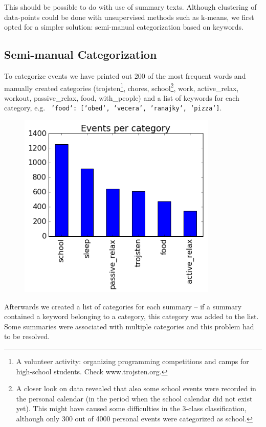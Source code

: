\documentclass[a4paper, 12pt]{article}
\begin{document}
This should be possible to do with use of summary texts. Although clustering
of data-points could be done with unsupervised methods such as k-means,
we first opted for a simpler solution: semi-manual categorization based on keywords. 

\subsection{Semi-manual Categorization}
To categorize events we have printed out 200 of the most frequent words
and manually created categories (trojsten\footnote{A volunteer activity: organizing
programming competitions and camps for high-school students. Check www.trojsten.org.}, 
chores, school\footnote{A closer look on data revealed that also some school events 
were recorded in the personal calendar (in the period when the school calendar did not exist yet).
This might have caused some difficulties in the 3-class classification, although
only 300 out of 4000 personal events were categorized as school.}, work, 
active\_relax, workout, passive\_relax, food, with\_people) 
and a list of keywords for each category, e.g. \texttt{
{'}food{'}: [{'}obed{'}, {'}vecera{'}, {'}ranajky{'}, {'}pizza{'}]}.

\begin{figure}
\centering
\includegraphics[width=0.9\linewidth]{events_per_category.png}
\end{figure}

Afterwards we created a list of categories for each summary -- if a summary contained
a keyword belonging to a category, this category was added to the list. Some summaries
were associated with multiple categories and this problem had to be resolved. 
\end{document}

